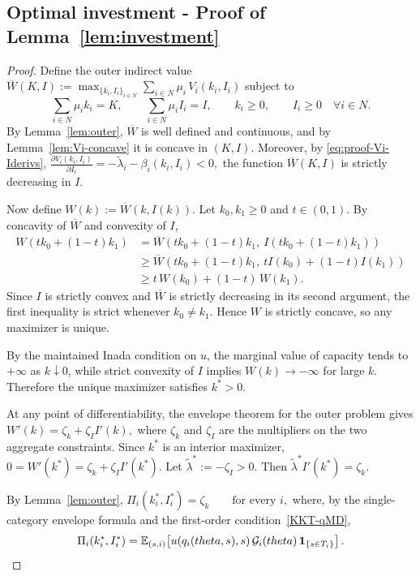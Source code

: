 \documentclass{class}
\begin{document}
\subsection{Optimal investment - Proof of Lemma~\ref{lem:investment}}\label{proof:leminvestment}


\begin{proof}
Define the outer indirect value
$\overline W(K,I) := \max_{\{k_i,I_i\}_{i\in N}} \sum_{i\in N}\mu_i\,V_i(k_i,I_i)$
subject to
\[
\sum_{i\in N}\mu_i k_i = K,
\qquad
\sum_{i\in N}\mu_i I_i = I,
\qquad
k_i\geq 0,
\qquad
I_i\geq 0
\quad \forall i\in N.
\]
By Lemma~\ref{lem:outer}, $\overline W$ is well defined and continuous, and by Lemma~\ref{lem:Vi-concave} it is concave in $(K,I)$. Moreover, by \ref{eq:proof-Vi-Iderivs}, $\frac{\partial  V_i(k_i,I_i)}{\partial I_i}=-\tilde\lambda_i-\beta_i(k_i,I_i)<0,$
the function $\overline W(K,I)$ is strictly decreasing in $I$.

Now define
$W(k):=\overline W\!\left(k,I(k)\right).$
Let $k_0,k_1\geq 0$ and $t\in(0,1)$. By concavity of $\overline W$ and convexity of $I$,
\[
\begin{aligned}
W\!\left(tk_0+(1-t)k_1\right)
&=
\overline W\!\left(tk_0+(1-t)k_1,\ I\!\left(tk_0+(1-t)k_1\right)\right) \\
&\geq
\overline W\!\left(tk_0+(1-t)k_1,\ tI(k_0)+(1-t)I(k_1)\right) \\
&\geq
t\,W(k_0)+(1-t)\,W(k_1).
\end{aligned}
\]
Since $I$ is strictly convex and $\overline W$ is strictly decreasing in its second argument, the first inequality is strict whenever $k_0\neq k_1$. Hence $W$ is strictly concave, so any maximizer is unique.

By the maintained Inada condition on $u$, the marginal value of capacity tends to $+\infty$ as $k\downarrow 0$, while strict convexity of $I$ implies $W(k)\to -\infty$ for large $k$. Therefore the unique maximizer satisfies $k^\ast>0$.

At any point of differentiability, the envelope theorem for the outer problem gives
$W'(k)=\zeta_k+\zeta_I I'(k),$
where $\zeta_k$ and $\zeta_I$ are the multipliers on the two aggregate constraints. Since $k^\ast$ is an interior maximizer,
$0=W'(k^\ast)=\zeta_k+\zeta_I I'(k^\ast).$
Let
$\tilde\lambda^\ast:=-\zeta_I>0.$
Then
$\tilde\lambda^\ast I'(k^\ast)=\zeta_k.$

By Lemma~\ref{lem:outer},
$\Pi_i(k_i^\ast,I_i^\ast)=\zeta_k \qquad\text{for every }i,$
where, by the single-category envelope formula and the first-order condition~\ref{KKT-qMD},
\[
\Pi_i(k_i^\ast,I_i^\ast)
=
\mathbb{E}_{(s,i)}\!\left[
u(q_i(theta,s),s)\,\mathcal{G}_i(theta)\,\mathbf 1_{\{s\in T_i\}}
\right].
\]


\end{proof}
\end{document}
